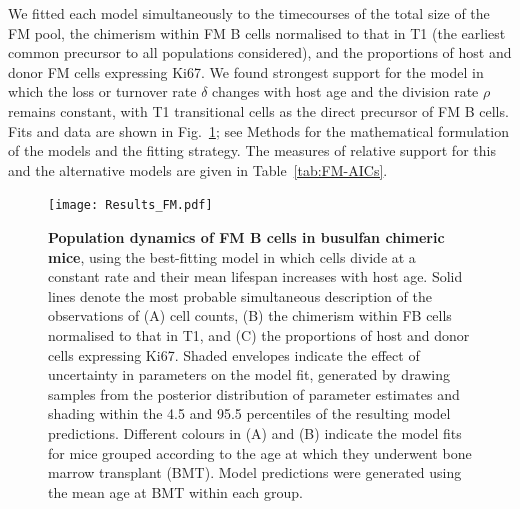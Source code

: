 \documentclass[11pt]{article}
\newcommand{\red}[1]{{\color{red}{#1}}}
\newcommand{\khi}{Ki67$^\text{hi}$}
\begin{document}
We fitted each model  simultaneously to the timecourses of the total size of the FM pool, the chimerism within FM B cells normalised to that in T1 (the earliest common precursor to all populations considered), and the proportions of host and donor FM cells expressing Ki67. We found strongest support for the model in which the loss or turnover rate $\delta$ changes with host age and the division rate $\rho$ remains constant, with T1 transitional cells as the direct precursor of FM B cells.  Fits and data are shown in Fig.~\ref{fig:results_FM}; see Methods for the mathematical formulation of the models and the fitting strategy.  The measures of relative support for this and the alternative models are given in Table~\ref{tab:FM-AICs}.

 	\begin{figure}[htbp]
		\centerline{\texttt{[image: Results\_FM.pdf]}}
		\caption{ \textbf{Population dynamics of FM B cells in busulfan chimeric mice}, using the best-fitting model in which cells divide at a constant rate and their mean lifespan increases with host age.
		Solid lines denote the most probable simultaneous description of the observations of (A) cell counts, (B) the  chimerism within FB cells normalised to that in T1,  and (C) the proportions of host and donor cells expressing Ki67. Shaded envelopes indicate the effect of uncertainty in parameters on the model fit, generated by drawing samples from the posterior distribution of parameter estimates and shading within the 4.5 and 95.5 percentiles of the resulting model predictions. Different colours in (A) and (B) indicate the model fits for mice grouped according to the age at which they underwent bone marrow transplant (BMT). Model predictions were generated using the mean age at BMT within each group.}
		\label{fig:results_FM}
	\end{figure}
\end{document}
